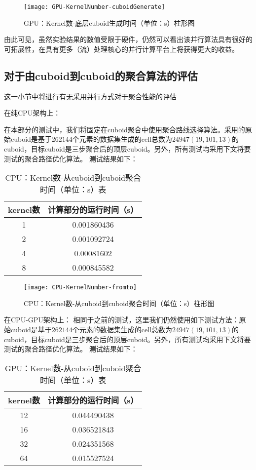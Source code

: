 \begin{figure}[ht]
\centering
\texttt{[image: GPU-KernelNumber-cuboidGenerate]}
\caption{GPU：Kernel数-底层cuboid生成时间（单位：s）柱形图} 
\label{fig:figure3}
\end{figure}

由此可见，虽然实验结果的数值受限于硬件，仍然可以看出该并行算法具有很好的可拓展性，在具有更多（流）处理核心的并行计算平台上将获得更大的收益。

\subsection{对于由cuboid到cuboid的聚合算法的评估}

这一小节中将进行有无采用并行方式对于聚合性能的评估

在纯CPU架构上：

在本部分的测试中，我们将固定在cuboid聚合中使用聚合路线选择算法。采用的原始cuboid是基于$262144$个元素的数据集生成的cell总数为$24947$$(19, 101, 13)$的cuboid，目标cuboid是三步聚合后的顶层cuboid。另外，所有测试均采用下文将要测试的聚合路径优化算法。
测试结果如下：

\begin{table}[!htbp]
\centering
\caption{CPU：Kernel数-从cuboid到cuboid聚合时间（单位：s）表} 
\label{tab:table8}
\begin{tabular}{|c|c|}
    \hline
    kernel数 & 计算部分的运行时间（s）\\
    \hline
    1 & 0.001860436\\
    \hline
    2 & 0.001092724\\
    \hline
    4 & 0.00081602\\
    \hline
    8 & 0.000845582\\
    \hline
\end{tabular}
\end{table}

\begin{figure}[ht]
\centering
\texttt{[image: CPU-KernelNumber-fromto]}
\caption{CPU：Kernel数-从cuboid到cuboid聚合时间（单位：s）柱形图} 
\label{fig:figure4}
\end{figure}

在CPU-GPU架构上：
相同于之前的测试，这里我们仍然使用如下测试方法：原始cuboid是基于$262144$个元素的数据集生成的cell总数为$24947$$(19, 101, 13)$的cuboid，目标cuboid是三步聚合后的顶层cuboid。另外，所有测试均采用下文将要测试的聚合路径优化算法。
测试结果如下：

\begin{table}[!htbp]
\centering
\caption{GPU：Kernel数-从cuboid到cuboid聚合时间（单位：s）表} 
\label{tab:table9}
\begin{tabular}{|c|c|}
    \hline
    kernel数 & 计算部分的运行时间（s）\\
    \hline
    12 & 0.044490438\\
    \hline
    16 & 0.036521843\\
    \hline
    32 & 0.024351568\\
    \hline
    64 & 0.015527524\\
    \hline
\end{tabular}
\end{table}

